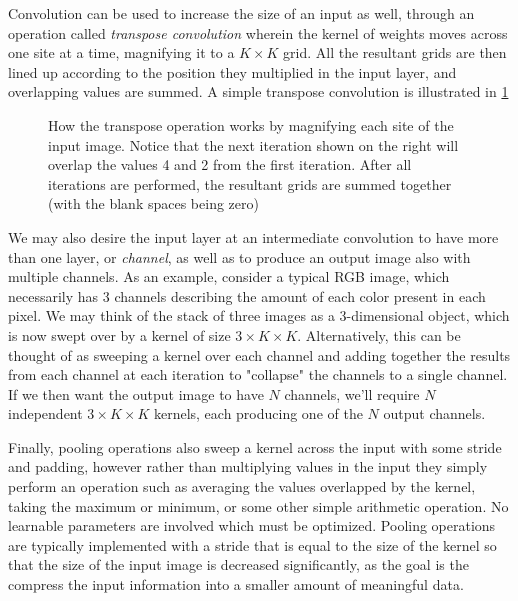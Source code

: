 \documentclass[12pt]{article}
\begin{document}
Convolution can be used to increase the size of an input as well, through an operation called \textit{transpose convolution} wherein the kernel of weights
moves across one site at a time, magnifying it to a $K \times K$ grid. All the resultant grids are then lined up according to the position they 
multiplied in the input layer, and overlapping values are summed. A simple transpose convolution is illustrated in \ref{fig:transconv2d}

\begin{figure}[h]
	\begin{center}
	
	\end{center}
	\caption[Transpose Convolution Demonstration]{How the transpose operation works by magnifying each site of the input image. Notice that the next iteration shown 
	on the right will overlap the values 4 and 2 from the first iteration. After all iterations are performed, the resultant
	grids are summed together (with the blank spaces being zero)}
	\label{fig:transconv2d}
\end{figure}

We may also desire the input layer at an intermediate convolution to have more than one layer, or \textit{channel}, as well as to produce an output image also
with multiple channels. As an example, consider a typical RGB image, which necessarily has 3 channels describing the amount of each color present in each pixel.
We may think of the stack of three images as a 3-dimensional object, which is now swept over by a kernel of size $3\times K\times K$. Alternatively, this can be thought of
as sweeping a kernel over each channel and adding together the results from each channel at each iteration to "collapse" the channels to a single channel. If we then
want the output image to have $N$ channels, we'll require $N$ independent $3\times K\times K$ kernels, each producing one of the $N$ output channels.

Finally, pooling operations also sweep a kernel across the input with some stride and padding, however rather than multiplying values in the input
they simply perform an operation such as averaging the values overlapped by the kernel, taking the maximum or minimum, or some other simple arithmetic operation. 
No learnable parameters are involved which must be optimized. Pooling operations are typically implemented with a stride that is equal to the size of the kernel so that the size of the input image is
decreased significantly, as the goal is the compress the input information into a smaller amount of meaningful data.
\end{document}
